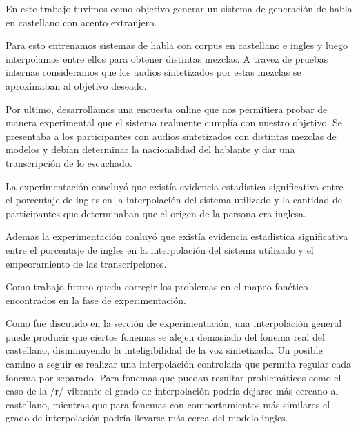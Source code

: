 En este trabajo tuvimos como objetivo generar un sistema de generación de habla en castellano con acento extranjero.

Para esto entrenamos sistemas de habla con corpus en castellano e ingles y luego interpolamos entre ellos para obtener distintas mezclas. A travez de pruebas internas consideramos que los audios sintetizados por estas mezclas se aproximaban al objetivo deseado.

Por ultimo, desarrollamos una encuesta online que nos permitiera probar de manera experimental que el sistema realmente cumplía con nuestro objetivo. Se presentaba a los participantes con audios sintetizados con distintas mezclas de modelos y debían determinar la nacionalidad del hablante y dar una transcripción de lo escuchado.

La experimentación concluyó que existía evidencia estadistica significativa entre el porcentaje de ingles en la interpolación del sistema utilizado y la cantidad de participantes que determinaban que el origen de la persona era inglesa.

Ademas la experimentación conluyó que existía evidencia estadistica significativa entre el porcentaje de ingles en la interpolación del sistema utilizado y el empeoramiento de las transcripciones.

Como trabajo futuro queda corregir los problemas en el mapeo fonético encontrados en la fase de experimentación.

Como fue discutido en la sección de experimentación, una interpolación general puede producir que ciertos fonemas se alejen demasiado del fonema real del castellano, disminuyendo la inteligibilidad de la voz sintetizada. Un posible camino a seguir es realizar una interpolación controlada que permita regular cada fonema por separado. Para fonemas que puedan resultar problemáticos como el caso de la /r/ vibrante el grado de interpolación podría dejarse más cercano al castellano, mientras que para fonemas con comportamientos más similares el grado de interpolación podría llevarse más cerca del modelo ingles.